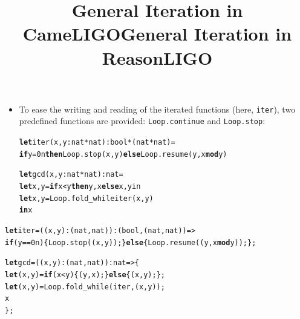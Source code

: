\documentclass[wide]{slides}
\newcommand{\Kelse}[0]{\textbf{else}\xspace}
\newcommand{\Kif}[0]{\textbf{if}\xspace}
\newcommand{\Kin}[0]{\textbf{in}\xspace}
\newcommand{\Kmod}[0]{\textbf{mod}\xspace}
\newcommand{\Kthen}[0]{\textbf{then}\xspace}
\newcommand{\Klet}[0]{\textbf{let}\xspace}
\begin{document}
\begin{slide}
  \title{General Iteration in CameLIGO}

  \begin{itemize}

    \item To ease the writing and reading of the iterated functions
      (here, \texttt{iter}), two predefined functions are provided:
      \texttt{Loop.continue} and \texttt{Loop.stop}:
      \begin{alltt}
\Klet iter (x,y : nat * nat) : bool * (nat * nat) =
  \Kif y = 0n \Kthen Loop.stop (x,y) \Kelse Loop.resume (y, x \Kmod y)

\Klet gcd (x,y : nat * nat) : nat =
  \Klet x,y = \Kif x < y \Kthen y,x \Kelse x,y in
  \Klet x,y = Loop.fold\_while iter (x,y)
  \Kin x
      \end{alltt}

  \end{itemize}

\end{slide}

\begin{slide}
  \title{General Iteration in ReasonLIGO}

  \begin{alltt}
\Klet iter = ((x,y) : (nat, nat)) : (bool, (nat, nat)) =>
  \Kif (y == 0n) \{ Loop.stop ((x,y)); \} \Kelse \{ Loop.resume ((y, x \Kmod y)); \};

\Klet gcd = ((x,y) : (nat, nat)) : nat => \{
  \Klet (x,y) = \Kif (x < y) \{ (y,x); \} \Kelse \{ (x,y); \};
  \Klet (x,y) = Loop.fold_while (iter, (x,y));
  x
\};
  \end{alltt}

\end{slide}
\end{document}
